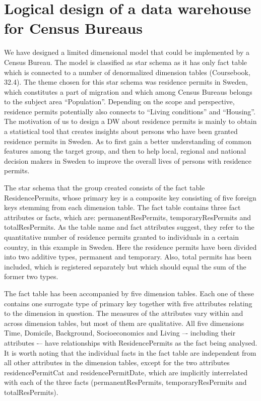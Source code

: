 \section{Logical design of a data warehouse for Census Bureaus}
We have designed a limited dimensional model that could be implemented by a Census Bureau. 
The model is classified as star schema as it has only fact table which is connected to a number 
of denormalized dimension tables (Coursebook, 32.4). The theme chosen for this star schema was 
residence permits in Sweden, which constitutes a part of migration and which among Census Bureaus 
belongs to the subject area “Population”. Depending on the scope and perspective, residence permits 
potentially also connects to “Living conditions” and “Housing”. The motivation of us to design a DW 
about residence permits is mainly to obtain a statistical tool that creates insights about persons 
who have been granted residence permits in Sweden. As to first gain a better understanding of common 
features among the target group, and then to help local, regional and national decision makers in 
Sweden to improve the overall lives of persons with residence permits. 

The star schema that the group created consists of the fact table ResidencePermits, whose primary 
key is a composite key consisting of five foreign keys stemming from each dimension table. The fact 
table contains three fact attributes or facts, which are: permanentResPermits, temporaryResPermits and 
totalResPermits. As the table name and fact attributes suggest, they refer to the quantitative number 
of residence permits granted to individuals in a certain country, in this example in Sweden. Here the 
residence permits have been divided into two additive types, permanent and temporary. Also, total 
permits has been included, which is registered separately but which should equal the sum of the former two types. 

The fact table has been accompanied by five dimension tables. Each one of these contains one surrogate 
type of primary key together with five attributes relating to the dimension in question. The measures 
of the attributes vary within and across dimension tables, but most of them are qualitative. All five 
dimensions Time, Domicile, Background, Socioeconomics and Living –- including their attributes -– have 
relationships with ResidencePermits as the fact being analysed. It is worth noting that the individual 
facts in the fact table are independent from all other attributes in the dimension tables, except for the 
two attributes residencePermitCat and residencePermitDate, which are implicitly interrelated with each of 
the three facts (permanentResPermits, temporaryResPermits and totalResPermits). 
\newpage
